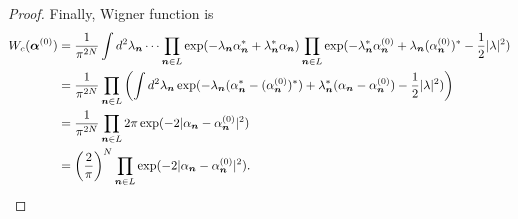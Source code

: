 \begin{proof}
Finally, Wigner function is
\begin{equation*}
\begin{split}
	W_c (\bm{\alpha}^{(0)})
	& = \frac{1}{\pi^{2N}} \int d^2\lambda_{\boldsymbol{n}} \dots
		\prod_{\boldsymbol{n} \in L} \exp(
			- \lambda_{\boldsymbol{n}} \alpha_{\boldsymbol{n}}^*
			+ \lambda_{\boldsymbol{n}}^* \alpha_{\boldsymbol{n}}
		)
		\prod_{\boldsymbol{n} \in L} \exp(
			- \lambda_{\boldsymbol{n}}^* \alpha_{\boldsymbol{n}}^{(0)}
			+ \lambda_{\boldsymbol{n}} (\alpha_{\boldsymbol{n}}^{(0)})^*
			- \frac{1}{2} |\lambda|^2
		) \\
	& = \frac{1}{\pi^{2N}} \prod_{\boldsymbol{n} \in L} \left(
		\int d^2\lambda_{\boldsymbol{n}}
			\exp(
				- \lambda_{\boldsymbol{n}} (\alpha_{\boldsymbol{n}}^* - (\alpha_{\boldsymbol{n}}^{(0)})^*)
				+ \lambda_{\boldsymbol{n}}^* (\alpha_{\boldsymbol{n}} - \alpha_{\boldsymbol{n}}^{(0)})
				- \frac{1}{2} |\lambda|^2
			)
	\right) \\
	& = \frac{1}{\pi^{2N}} \prod_{\boldsymbol{n} \in L}
		2 \pi \exp(-2 |\alpha_{\boldsymbol{n}} - \alpha_{\boldsymbol{n}}^{(0)}|^2) \\
	& = \left( \frac{2}{\pi} \right)^N \prod_{\boldsymbol{n} \in L}
		\exp(-2 |\alpha_{\boldsymbol{n}} - \alpha_{\boldsymbol{n}}^{(0)}|^2).
	\qedhere
\end{split}
\end{equation*}
\end{proof}
